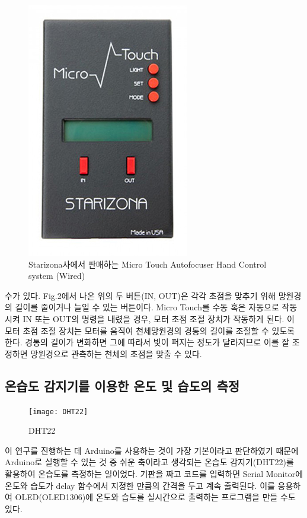 \begin{figure}[h]
	\includegraphics[width=0.6\linewidth]{microtouch_3}
	\caption{Starizona사에서 판매하는 Micro Touch Autofocuser Hand Control system (Wired)}
	\label{fig:microtouch_3}
\end{figure}

수가 있다. Fig.2에서 나온 위의 두 버튼(IN, OUT)은 각각 초점을 맞추기 위해 망원경의 길이를 줄이거나 늘일 수 있는 버튼이다. Micro Touch를 수동 혹은 자동으로 작동시켜 IN 또는 OUT의 명령을 내렸을 경우, 모터 초점 조절 장치가 작동하게 된다. 이 모터 초점 조절 장치는 모터를 움직여 천체망원경의 경통의 길이를 조절할 수 있도록 한다. 경통의 길이가 변화하면 그에 따라서 빛이 퍼지는 정도가 달라지므로 이를 잘 조정하면 망원경으로 관측하는 천체의 초점을 맞출 수 있다.

\subsection{온습도 감지기를 이용한 온도 및 습도의 측정}

\begin{figure}
	\texttt{[image: DHT22]}
	\caption{DHT22}
	\label{fig:DHT22}
\end{figure}
이 연구를 진행하는 데 Arduino를 사용하는 것이 가장 기본이라고 판단하였기 때문에 Arduino로 실행할 수 있는 것 중 쉬운 축이라고 생각되는 온습도 감지기(DHT22)를 활용하여 온습도를 측정하는 일이었다. 기판을 짜고 코드를 입력하면 Serial Monitor에 온도와 습도가 delay 함수에서 지정한 만큼의 간격을 두고 계속 출력된다. 이를 응용하여 OLED(OLED1306)에 온도와 습도를 실시간으로 출력하는 프로그램을 만들 수도 있다.

